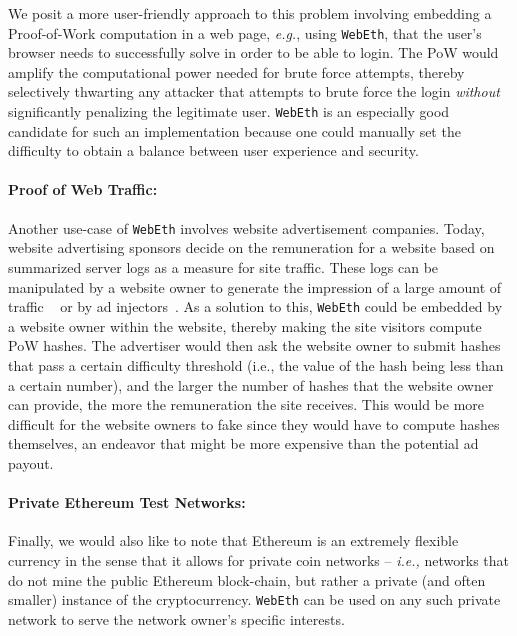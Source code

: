 \documentclass[runningheads]{llncs}
\begin{document}
We posit a more user-friendly approach to this problem involving embedding a Proof-of-Work computation in a web page, \emph{e.g.}, using \verb|WebEth|, that the user's browser needs to successfully solve in order to be able to login. The PoW would amplify the computational power needed for brute force attempts, thereby selectively thwarting any attacker that attempts to brute force the login \emph{without} significantly penalizing the legitimate user. \verb|WebEth| is an especially good candidate for such an implementation because one could manually set the difficulty to obtain a balance between user experience and security.

\paragraph{Proof of Web Traffic:}
Another use-case of \verb|WebEth| involves website advertisement companies. Today, website advertising sponsors decide on the remuneration for a website based on summarized server logs as a measure for site traffic. These logs can be manipulated by a website owner to generate the impression of a large amount of traffic ~\cite{webLogsManipulation} or by ad injectors~\cite{adinjection}. As a solution to this, \verb|WebEth| could be embedded by a website owner within the website, thereby making the site visitors compute PoW hashes. The advertiser would then ask the website owner to submit hashes that pass a certain difficulty threshold (i.e., the value of the hash being less than a certain number), and the larger the number of hashes that the website owner can provide, the more the remuneration the site receives. This would be more difficult for the website owners to fake since they would have to compute hashes themselves, an endeavor that might be more expensive than the potential ad payout.

\paragraph{Private Ethereum Test Networks:}
Finally, we would also like to note that Ethereum is an extremely flexible currency in the sense that it allows for private coin networks -- \emph{i.e.,} networks that do not mine the public Ethereum block-chain, but rather a private (and often smaller) instance of the cryptocurrency. \verb|WebEth| can be used on any such private network to serve the network owner's specific interests.
\end{document}

